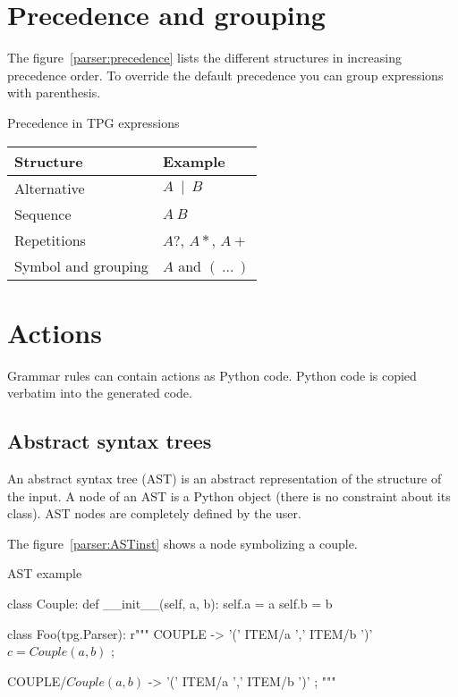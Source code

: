 \section{Precedence and grouping}

The figure~\ref{parser:precedence} lists the different structures in increasing precedence order.
To override the default precedence you can group expressions with parenthesis.

\begin{tableau}
\caption{Precedence in TPG expressions}							\label{parser:precedence}
\begin{tabular}{| l | l |}
\hline
	Structure			& Example \\
\hline
\hline
	Alternative			& $A~\mid~B$ \\
\hline
	Sequence			& $A~B$ \\
\hline
	Repetitions			& $A?$, $A*$, $A+$ \\
\hline
	Symbol and grouping	& $A$ and $(~\ldots~)$ \\
\hline
\end{tabular}
\end{tableau}

\section{Actions}

Grammar rules can contain actions as Python code.
Python code is copied verbatim into the generated code.

\subsection{Abstract syntax trees}								\label{parser:AST}

An abstract syntax tree (AST) is an abstract representation of the structure of the input.
A node of an AST is a Python object (there is no constraint about its class).
AST nodes are completely defined by the user.

The figure~\ref{parser:ASTinst} shows a node symbolizing a couple.

\begin{code}
\caption{AST example}											\label{parser:ASTinst}
\begin{verbatimtab}[4]

class Couple:
    def __init__(self, a, b):
        self.a = a
        self.b = b

class Foo(tpg.Parser):
    r"""
	COUPLE -> '(' ITEM/a ',' ITEM/b ')' $ c = Couple(a,b) $ ;

	COUPLE/$Couple(a,b)$ -> '(' ITEM/a ',' ITEM/b ')' ;
    """
\end{verbatimtab}
\end{code}

